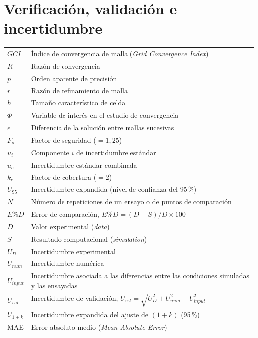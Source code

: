 \section*{Verificación, validación e incertidumbre}
\begin{longtable}{@{}p{} p{}@{}}
$GCI$       & Índice de convergencia de malla (\textit{Grid Convergence Index}) \\
$R$         & Razón de convergencia \\
$p$         & Orden aparente de precisión \\
$r$         & Razón de refinamiento de malla \\
$h$         & Tamaño característico de celda \\
$\Phi$      & Variable de interés en el estudio de convergencia \\
$\epsilon$  & Diferencia de la solución entre mallas sucesivas \\
$F_s$       & Factor de seguridad ($=1{,}25$) \\
$u_i$       & Componente $i$ de incertidumbre estándar \\
$u_c$       & Incertidumbre estándar combinada \\
$k_c$       & Factor de cobertura ($=2$) \\
$U_{95}$    & Incertidumbre expandida (nivel de confianza del 95\,\%) \\
$N$         & Número de repeticiones de un ensayo o de puntos de comparación \\
$E\%D$      & Error de comparación, $E\%D = (D-S)/D\times100$ \\
$D$         & Valor experimental (\textit{data}) \\
$S$         & Resultado computacional (\textit{simulation}) \\
$U_D$       & Incertidumbre experimental \\
$U_{num}$   & Incertidumbre numérica \\
$U_{input}$ & Incertidumbre asociada a las diferencias entre las condiciones simuladas y las ensayadas \\
$U_{val}$   & Incertidumbre de validación, $U_{val}=\sqrt{U_D^2+U_{num}^2+U_{input}^2}$ \\
$U_{1+k}$   & Incertidumbre expandida del ajuste de $(1+k)$ (95\,\%) \\
MAE         & Error absoluto medio (\textit{Mean Absolute Error}) \\
\end{longtable}

